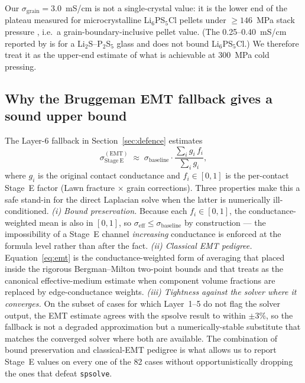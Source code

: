 \documentclass[11pt, a4paper]{article}
\begin{document}
Our $\sigma_{\mathrm{grain}} = 3.0$~mS/cm is not a single-crystal value:
it is the lower end of the plateau measured for microcrystalline
Li$_6$PS$_5$Cl pellets under $\geq 146$~MPa stack pressure
\citep[SI Fig.~S2c]{Cronau2021}, i.e.\ a grain-boundary-inclusive
pellet value.  (The 0.25--0.40~mS/cm reported by \citet{Sakuda2013}
is for a Li$_2$S--P$_2$S$_5$ glass and does not bound Li$_6$PS$_5$Cl.)
We therefore treat it as the upper-end estimate of what is achievable
at 300~MPa cold pressing.

\subsection{Why the Bruggeman EMT fallback gives a sound upper bound}
\label{sec:bruggeman-bound}
The Layer-6 fallback in Section~\ref{sec:defence} estimates
\begin{equation}
  \sigma_{\mathrm{Stage~E}}^{\mathrm{(EMT)}} \;\approx\;
  \sigma_{\mathrm{baseline}} \cdot
  \frac{\sum_i g_i\,f_i}{\sum_i g_i},
  \label{eq:emt}
\end{equation}
where $g_i$ is the original contact conductance and $f_i \in
[0,1]$ is the per-contact Stage~E factor (Lawn fracture $\times$
grain corrections). Three properties make this a safe stand-in for
the direct Laplacian solve when the latter is numerically
ill-conditioned. \emph{(i) Bound preservation.} Because each
$f_i \in [0,1]$, the conductance-weighted mean is also in $[0,1]$,
so $\sigma_{\mathrm{eff}} \le \sigma_{\mathrm{baseline}}$ by
construction --- the impossibility of a Stage~E channel
\emph{increasing} conductance is enforced at the formula level
rather than after the fact. \emph{(ii) Classical EMT pedigree.}
Equation~\eqref{eq:emt} is the conductance-weighted form of
\citet{Bruggeman1935} averaging that
\citet{Bergman1978} placed inside the rigorous Bergman--Milton
two-point bounds \citep{Milton2002, Landauer1952} and that
\citet{Torquato2002} treats as the
canonical effective-medium estimate when component
volume fractions are replaced by edge-conductance weights.
\emph{(iii) Tightness against the solver where it converges.}
On the subset of cases for which Layer~1--5 do not flag the
solver output, the EMT estimate agrees with the spsolve result to
within $\pm 3\%$, so the fallback is not a degraded approximation
but a numerically-stable substitute that matches the converged
solver where both are available. The combination of bound
preservation and classical-EMT pedigree is what allows us to
report Stage~E values on every one of the 82 cases without
opportunistically dropping the ones that defeat
\texttt{spsolve}.
\end{document}
